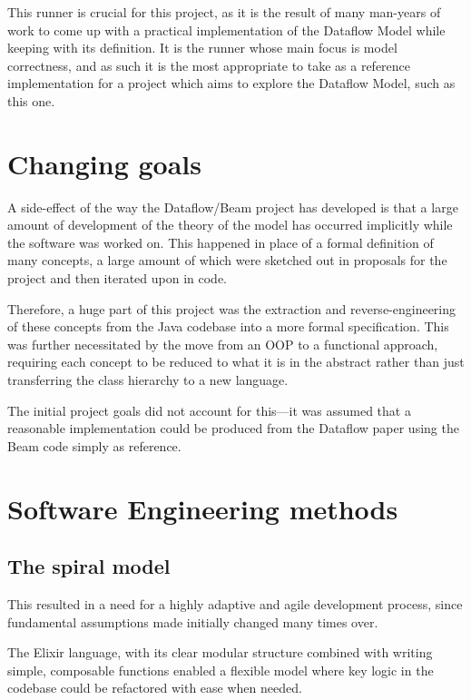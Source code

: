 This runner is crucial for this project, as it is the result of many man-years of work to come up with a practical implementation of the Dataflow Model while keeping with its definition.
It is the runner whose main focus is model correctness, and as such it is the most appropriate to take as a reference implementation for a project which aims to explore the Dataflow Model, such as this one.


\section{Changing goals}

A side-effect of the way the Dataflow/Beam project has developed is that a large amount of development of the theory of the model has occurred implicitly while the software was worked on.
This happened in place of a formal definition of many concepts, a large amount of which were sketched out in proposals for the project and then iterated upon in code.

Therefore, a huge part of this project was the extraction and reverse-engineering of these concepts from the Java codebase into a more formal specification.
This was further necessitated by the move from an OOP to a functional approach, requiring each concept to be reduced to what it is in the abstract rather than just transferring the class hierarchy to a new language.

The initial project goals did not account for this---it was assumed that a reasonable implementation could be produced from the Dataflow paper \cite{Akidau:2015} using the Beam code simply as reference.


\section{Software Engineering methods}\label{sec:prep:softeng}

\subsection{The spiral model}


This resulted in a need for a highly adaptive and agile development process, since fundamental assumptions made initially changed many times over.


The Elixir language, with its clear modular structure combined with writing simple, composable functions enabled a flexible model where key logic in the codebase could be refactored with ease when needed.


